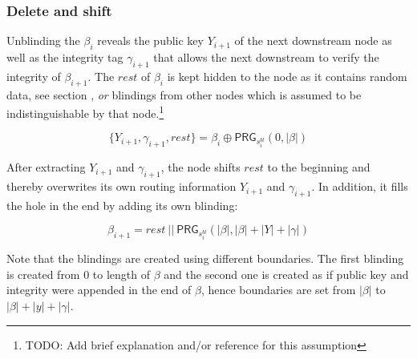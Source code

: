 \subsubsection{Delete and shift}
\label{sec:sphinx:shifting}

Unblinding the $\beta_i$ reveals the public key $Y_{i+1}$ of the next downstream node as well as the integrity tag $\gamma_{i+1}$ that allows the next downstream to verify the integrity of $\beta_{i+1}$. The $rest$ of $\beta_i$ is kept hidden to the node as it contains random data, see section , \textit{or} blindings from other nodes which is assumed to be indistinguishable by that node.\footnote{TODO: Add brief explanation and/or reference for this assumption}

$$ \{ Y_{i+1}, \gamma_{i+1}, rest \} = \beta_i \oplus \textsf{PRG}_{s_i^{bl}}(0, | \beta |) $$

After extracting $Y_{i+1}$ and $\gamma_{i+1}$, the node shifts $rest$ to the beginning and thereby overwrites its own routing information $Y_{i+1}$ and $\gamma_{i+1}$. In addition, it fills the hole in the end by adding its own blinding:

$$ \beta_{i+1} = rest \ || \ \textsf{PRG}_{s_i^{bl}}(| \beta |, | \beta | + |Y| + |\gamma|)$$

Note that the blindings are created using different boundaries. The first blinding is created from 0 to length of $\beta$ and the second one is created as if public key and integrity were appended in the end of $\beta$, hence boundaries are set from $| \beta |$ to $| \beta | + |y| + |\gamma|$.

